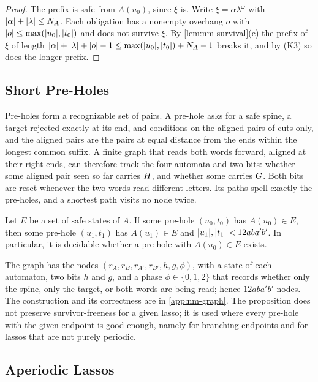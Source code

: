 \begin{proof}
The prefix is safe from $A(u_0)$, since $\xi$ is. Write
$\xi=\alpha\lambda^\omega$ with $\lvert \alpha\rvert+\lvert \lambda\rvert\le N_A$. Each
obligation has a nonempty overhang $o$ with $\lvert o\rvert\le\max(\lvert u_0\rvert,\lvert t_0\rvert)$
and does not survive $\xi$. By \cref{lem:nm-survival}(c) the prefix of $\xi$ of
length $\lvert \alpha\rvert+\lvert \lambda\rvert+\lvert o\rvert-1\le\max(\lvert u_0\rvert,\lvert t_0\rvert)+N_A-1$
breaks it, and by (K3) so does the longer prefix.
\end{proof}

\subsection{Short Pre-Holes}\label{sec:nm-short}

Pre-holes form a recognizable set of pairs. A pre-hole asks for a safe spine,
a target rejected exactly at its end, and conditions on the aligned pairs of
cuts only, and the aligned pairs are the pairs at equal distance from the ends
within the longest common suffix. A finite graph that reads both words
forward, aligned at their right ends, can therefore track the four automata
and two bits: whether some aligned pair seen so far carries $H$, and
whether some carries $G$. Both bits are reset whenever the two words
read different letters. Its paths spell exactly the pre-holes, and a shortest
path visits no node twice.

\begin{proposition}\label{prop:nm-short-prehole}
Let $E$ be a set of safe states of $A$. If some pre-hole $(u_0,t_0)$ has
$A(u_0)\in E$, then some pre-hole $(u_1,t_1)$ has $A(u_1)\in E$ and
$\lvert u_1\rvert,\lvert t_1\rvert<12aba'b'$. In particular, it is decidable whether a pre-hole
with $A(u_0)\in E$ exists.
\end{proposition}

The graph has the nodes $(r_A,r_B,r_{A'},r_{B'},h,g,\phi)$, with a state of
each automaton, two bits $h$ and $g$, and a phase $\phi\in\{0,1,2\}$ that
records whether only the spine, only the target, or both words are being read;
hence $12aba'b'$ nodes. The construction and its correctness are in
\cref{app:nm-graph}. The proposition does not preserve survivor-freeness for a
given lasso; it is used where every pre-hole with the given endpoint is good
enough, namely for branching endpoints and for lassos that are not purely
periodic.

\subsection{Aperiodic Lassos}\label{sec:nm-aperiodic}

